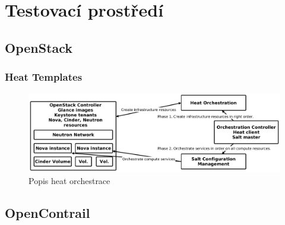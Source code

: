 \chapter{Testovací prostředí}

\section{OpenStack}\label{sub:interaction}

\subsection{}

\subsection{Heat Templates}

\begin{figure}[h]
\begin{centering}
\includegraphics[scale=0.21]{images/heat}
\par\end{centering}
\caption{Popis heat orchestrace\label{fig:heat}}
\end{figure}

\section{OpenContrail}\label{sub:interaction}